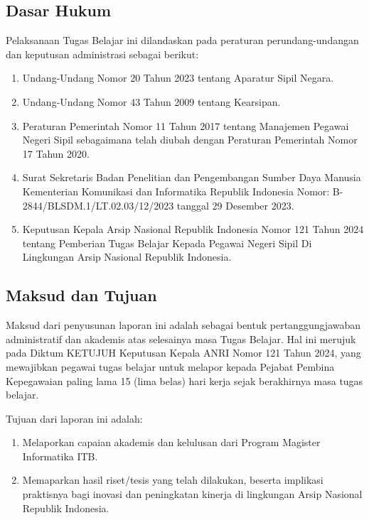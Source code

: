 \documentclass[11pt, a4paper]{article}
\begin{document}
\subsection{Dasar Hukum}
Pelaksanaan Tugas Belajar ini dilandaskan pada peraturan perundang-undangan dan keputusan administrasi sebagai berikut:
\begin{enumerate}
    \item Undang-Undang Nomor 20 Tahun 2023 tentang Aparatur Sipil Negara.
    \item Undang-Undang Nomor 43 Tahun 2009 tentang Kearsipan.
    \item Peraturan Pemerintah Nomor 11 Tahun 2017 tentang Manajemen Pegawai Negeri Sipil sebagaimana telah diubah dengan Peraturan Pemerintah Nomor 17 Tahun 2020.
    \item Surat Sekretaris Badan Penelitian dan Pengembangan Sumber Daya Manusia Kementerian Komunikasi dan Informatika Republik Indonesia Nomor: B-2844/BLSDM.1/LT.02.03/12/2023 tanggal 29 Desember 2023.
    \item Keputusan Kepala Arsip Nasional Republik Indonesia Nomor 121 Tahun 2024 tentang Pemberian Tugas Belajar Kepada Pegawai Negeri Sipil Di Lingkungan Arsip Nasional Republik Indonesia.
\end{enumerate}

\subsection{Maksud dan Tujuan}
Maksud dari penyusunan laporan ini adalah sebagai bentuk pertanggungjawaban administratif dan akademis atas selesainya masa Tugas Belajar. Hal ini merujuk pada Diktum KETUJUH Keputusan Kepala ANRI Nomor 121 Tahun 2024, yang mewajibkan pegawai tugas belajar untuk melapor kepada Pejabat Pembina Kepegawaian paling lama 15 (lima belas) hari kerja sejak berakhirnya masa tugas belajar. 

Tujuan dari laporan ini adalah:
\begin{enumerate}
    \item Melaporkan capaian akademis dan kelulusan dari Program Magister Informatika ITB.
    \item Memaparkan hasil riset/tesis yang telah dilakukan, beserta implikasi praktisnya bagi inovasi dan peningkatan kinerja di lingkungan Arsip Nasional Republik Indonesia.
\end{enumerate}

\vspace{0.5cm}
\end{document}
